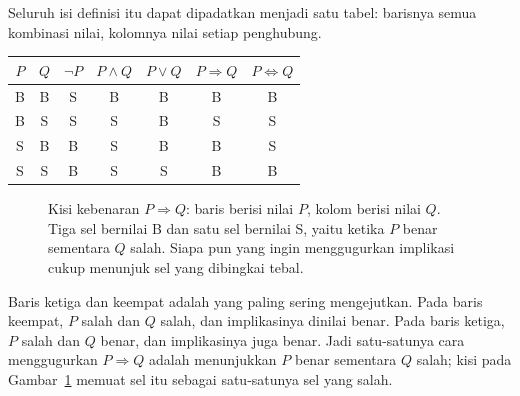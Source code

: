 Seluruh isi definisi itu dapat dipadatkan menjadi satu tabel: barisnya semua kombinasi
nilai, kolomnya nilai setiap penghubung.

{\centering
\begin{tabular}{cc|ccccc}
\hline
$P$ & $Q$ & $\neg P$ & $P \wedge Q$ & $P \vee Q$ & $P \Rightarrow Q$ & $P \Leftrightarrow Q$ \\
\hline
B & B & S & B & B & B & B \\
B & S & S & S & B & S & S \\
S & B & B & S & B & B & S \\
S & S & B & S & S & B & B \\
\hline
\end{tabular}\par}

\begin{figure}[htbp]
\centering
{}
\caption{Kisi kebenaran $P \Rightarrow Q$: baris berisi nilai $P$, kolom berisi nilai $Q$.
Tiga sel bernilai B dan satu sel bernilai S, yaitu ketika $P$ benar sementara $Q$ salah.
Siapa pun yang ingin menggugurkan implikasi cukup menunjuk sel yang dibingkai tebal.}
\label{fig:kisi-implikasi}
\end{figure}

Baris ketiga dan keempat adalah yang paling sering mengejutkan. Pada baris keempat,
$P$ salah dan $Q$ salah, dan implikasinya dinilai benar. Pada baris ketiga, $P$ salah
dan $Q$ benar, dan implikasinya juga benar. Jadi satu-satunya cara menggugurkan
$P \Rightarrow Q$ adalah menunjukkan $P$ benar sementara $Q$ salah; kisi pada
Gambar~\ref{fig:kisi-implikasi} memuat sel itu sebagai satu-satunya sel yang salah.

